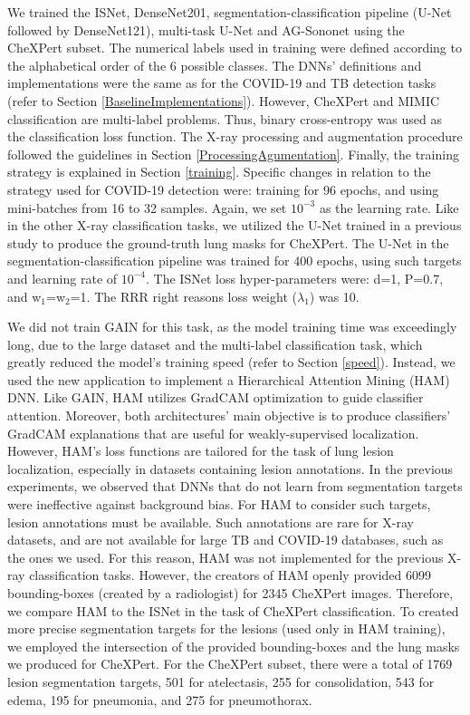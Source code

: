 \documentclass[fleqn,10pt]{wlscirep}
\begin{document}
{We trained the ISNet, DenseNet201, segmentation-classification pipeline (U-Net followed by DenseNet121), multi-task U-Net and AG-Sononet using the CheXPert subset. The numerical labels used in training were defined according to the alphabetical order of the 6 possible classes. The DNNs' definitions and implementations were the same as for the COVID-19 and TB detection tasks (refer to Section \ref{BaselineImplementations}). However, CheXPert and MIMIC classification are multi-label problems. Thus, binary cross-entropy was used as the classification loss function. The X-ray processing and augmentation procedure followed the guidelines in Section \ref{ProcessingAgumentation}. Finally, the training strategy is explained in Section \ref{training}. Specific changes in relation to the strategy used for COVID-19 detection were: training for 96 epochs, and using mini-batches from 16 to 32 samples. Again, we set $10^{-3}$ as the learning rate. Like in the other X-ray classification tasks, we utilized the U-Net trained in a previous study\cite{bassi2021covid19} to produce the ground-truth lung masks for CheXPert. The U-Net in the segmentation-classification pipeline was trained for 400 epochs, using such targets and learning rate of $10^{-4}$. The ISNet loss hyper-parameters were: d=1, P=0.7, and w$_{1}$=w$_{2}$=1. The RRR right reasons\cite{RRR} loss weight ($\lambda_{1}$) was 10.

We did not train GAIN\cite{GAIN} for this task, as the model training time was exceedingly long, due to the large dataset and the multi-label classification task, which greatly reduced the model's training speed (refer to Section \ref{speed}). Instead, we used the new application to implement a Hierarchical Attention Mining\cite{HAM} (HAM) DNN. Like GAIN, HAM utilizes GradCAM optimization to guide classifier attention. Moreover, both architectures' main objective is to produce classifiers' GradCAM explanations that are useful for weakly-supervised localization. However, HAM's loss functions are tailored for the task of lung lesion localization, especially in datasets containing lesion annotations. In the previous experiments, we observed that DNNs that do not learn from segmentation targets were ineffective against background bias. For HAM to consider such targets, lesion annotations must be available. Such annotations are rare for X-ray datasets, and are not available for large TB and COVID-19 databases, such as the ones we used. For this reason, HAM was not implemented for the previous X-ray classification tasks. However, the creators of HAM openly provided 6099 bounding-boxes (created by a radiologist) for 2345 CheXPert images\cite{HAM}. Therefore, we compare HAM to the ISNet in the task of CheXPert classification. To created more precise segmentation targets for the lesions (used only in HAM training), we employed the intersection of the provided bounding-boxes and the lung masks we produced for CheXPert. For the CheXPert subset, there were a total of 1769 lesion segmentation targets, 501 for atelectasis, 255 for consolidation, 543 for edema, 195 for pneumonia, and 275 for pneumothorax.

}
\end{document}
